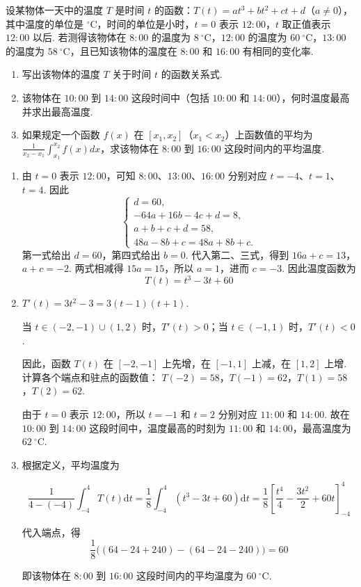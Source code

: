 \begin{problem}
设某物体一天中的温度 \(T\) 是时间 \(t\) 的函数：\(T(t)=at^3+bt^2+ct+d\)（\(a\ne0\)），其中温度的单位是 \(^{\circ}\mathrm{C}\)，时间的单位是小时，\(t=0\) 表示 \(12{:}00\)，\(t\) 取正值表示 \(12{:}00\) 以后. 若测得该物体在 \(8{:}00\) 的温度为 \(8\mathrm{~^{\circ}C}\)，\(12{:}00\) 的温度为 \(60\mathrm{~^{\circ}C}\)，\(13{:}00\) 的温度为 \(58\mathrm{~^{\circ}C}\)，且已知该物体的温度在 \(8{:}00\) 和 \(16{:}00\) 有相同的变化率.

\begin{enumerate}
\item 写出该物体的温度 \(T\) 关于时间 \(t\) 的函数关系式.
\item 该物体在 \(10{:}00\) 到 \(14{:}00\) 这段时间中（包括 \(10{:}00\) 和 \(14{:}00\)），何时温度最高并求出最高温度.
\item 如果规定一个函数 \(f(x) \) 在 \([x_1, x_2]\)（\(x_1 < x_2\)）上函数值的平均为 \(\frac{1}{x_2 - x_1} \int_{x_1}^{x_2} f(x) dx\)，求该物体在 \(8{:}00\) 到 \(16{:}00\) 这段时间内的平均温度.
\end{enumerate}
\end{problem}

\begin{solution}
\begin{enumerate}
\item 由 \(t=0\) 表示 \(12{:}00\)，可知 \(8{:}00\)、\(13{:}00\)、\(16{:}00\) 分别对应 \(t=-4\)、\(t=1\)、\(t=4\). 因此
\[
\begin{cases}
d=60,\\
-64a+16b-4c+d=8,\\
a+b+c+d=58,\\
48a-8b+c=48a+8b+c.
\end{cases}
\]
第一式给出 \(d=60\)，第四式给出 \(b=0\). 代入第二、三式，得到
\(16a+c=13\)，\(a+c=-2\).
两式相减得 \(15a=15\)，所以 \(a=1\)，进而 \(c=-3\). 因此温度函数为
\[
T(t)=t^3-3t+60
\]

\item \(T'(t)=3t^2-3=3(t-1)(t+1)\).

当 \(t\in(-2,-1)\cup(1,2)\) 时，\(T'(t)>0\)；当 \(t\in(-1,1)\) 时，\(T'(t)<0\).

因此，函数 \(T(t)\) 在 \([-2,-1]\) 上先增，在 \([-1,1]\) 上减，在 \([1,2]\) 上增. 计算各个端点和驻点的函数值：
\(T(-2)=58\)，\(T(-1)=62\)，\(T(1)=58\)，\(T(2)=62\).

由于 \(t=0\) 表示 \(12{:}00\)，所以 \(t=-1\) 和 \(t=2\) 分别对应 \(11{:}00\) 和 \(14{:}00\). 故在 \(10{:}00\) 到 \(14{:}00\) 这段时间中，温度最高的时刻为 \(11{:}00\) 和 \(14{:}00\)，最高温度为 \(62\mathrm{~^{\circ}C}\).

\item 根据定义，平均温度为

\[
\frac{1}{4-(-4)}\int_{-4}^{4}T(t)\mathrm{d}t
=\frac18\int_{-4}^{4}(t^3-3t+60)\mathrm{d}t
 =\frac18\left[\frac{t^4}{4}-\frac{3t^2}{2}+60t\right]_{-4}^{4}
\]

代入端点，得
\[
\frac18\bigl((64-24+240)-(64-24-240)\bigr)=60
\]

即该物体在 \(8{:}00\) 到 \(16{:}00\) 这段时间内的平均温度为 \(60\mathrm{~^{\circ}C}\).
\end{enumerate}
\end{solution}


